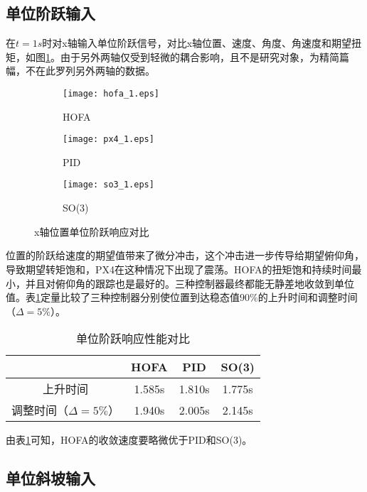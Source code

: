 \subsection*{单位阶跃输入}

  在$t=1s$时对x轴输入单位阶跃信号，对比x轴位置、速度、角度、角速度和期望扭矩，如图\ref{matlab_阶跃}。由于另外两轴仅受到轻微的耦合影响，且不是研究对象，为精简篇幅，不在此罗列另外两轴的数据。
\newpage
\newpage
\begin{figure}[!htp]
  \centering
  \begin{subfigure}[t]{0.49\textwidth}
    \centering
    \texttt{[image: hofa\_1.eps]}
    \caption{HOFA}
  \end{subfigure}\hfill
  \begin{subfigure}[t]{0.49\textwidth}
    \centering
    \texttt{[image: px4\_1.eps]}
    \caption{PID}
  \end{subfigure}\hfill
  \begin{subfigure}[t]{0.49\textwidth}
    \centering
    \texttt{[image: so3\_1.eps]}
    \caption{SO(3)}
  \end{subfigure}
  \caption{x轴位置单位阶跃响应对比}
  \label{matlab_阶跃}
\end{figure}

位置的阶跃给速度的期望值带来了微分冲击，这个冲击进一步传导给期望俯仰角，导致期望转矩饱和，PX4在这种情况下出现了震荡。HOFA的扭矩饱和持续时间最小，并且对俯仰角的跟踪也是最好的。三种控制器最终都能无静差地收敛到单位值。表\ref{matlab阶跃对比}定量比较了三种控制器分别使位置到达稳态值$90\%$的上升时间和调整时间（$\Delta = 5\%$）。
\begin{table}[!h]
  \centering
  \caption{单位阶跃响应性能对比}
  \begin{tabular}{cccc}
      \toprule
      & HOFA & PID & SO(3) \\
      \midrule
    上升时间 & 1.585s & 1.810s & 1.775s\\
    调整时间（$\Delta = 5\%$） & 1.940s & 2.005s &2.145s \\
      \bottomrule
  \end{tabular}
  \label{matlab阶跃对比}
\end{table}
由表\ref{matlab阶跃对比}可知，HOFA的收敛速度要略微优于PID和SO(3)。

\subsection*{单位斜坡输入}

